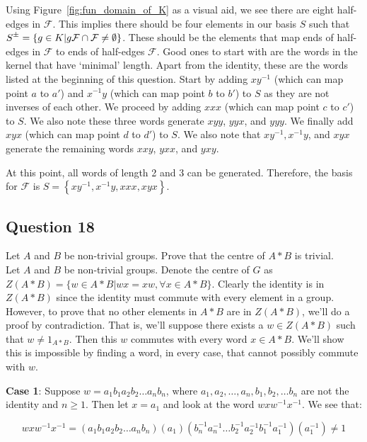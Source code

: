 \documentclass[12pt]{article}%
\newcommand{\rpm}{\raisebox{.2ex}{$\scriptstyle\pm$}}
\begin{document}
Using Figure~\ref{fig:fun_domain_of_K} as a visual aid, we see there are eight half-edges in
$\mathcal{F}$. This implies there should be four elements in our basis $S$ such that $S^{\rpm}=\left\{g\in
K | g\mathcal{F} \cap \mathcal{F} \neq \emptyset \right\}$. These should be the elements that map ends of
half-edges in $\mathcal{F}$ to ends of half-edges $\mathcal{F}$.  Good ones to start with are the words in
the kernel that have `minimal' length. Apart from the identity, these are the words listed at the
beginning of this question. Start by adding $xy^{-1}$ (which can map point $a$ to $a'$) and $x^{-1}y$
(which can map point $b$ to $b'$) to $S$ as they are not inverses of each other. We proceed by adding
$xxx$ (which can map point $c$ to $c'$) to $S$. We also note these three words generate $xyy$, $yyx$,
and $yyy$. We finally add $xyx$ (which can map point $d$ to $d'$) to $S$. We also note that $xy^{-1},
x^{-1}y$, and $xyx$ generate the remaining words $xxy$, $yxx$, and $yxy$. 

At this point, all words of length 2 and 3 can be generated. Therefore, the basis for $\mathcal{F}$ is
$S=\left\{xy^{-1}, x^{-1}y, xxx, xyx\right\}$.

\subsection*{Question 18}

Let $A$ and $B$ be non-trivial groups. Prove that the centre of $A*B$ is trivial. \\

Let $A$ and $B$ be non-trivial groups. Denote the centre of $G$ as
$Z(A*B)=\{ w \in A*B | wx=xw, \forall x \in A*B \}$. Clearly the identity is in $Z(A*B)$ since the
identity must commute with every element in a group. However, to prove that no other elements in $A*B$ are
in $Z(A*B)$, we'll do a proof by contradiction. That is, we'll suppose there exists a $w\in Z(A*B)$ such
that $w \neq 1_{A*B}$. Then this $w$ commutes with every word $x \in A*B$. We'll show this is impossible
by finding a word, in every case, that cannot possibly commute with $w$.

\textbf{Case 1}: Suppose $w=a_{1}b_{1}a_{2}b_{2}\ldots a_{n}b_{n}$, where
$a_1,a_2,\ldots ,a_n, b_1,b_2,\ldots b_n$ are not the identity and $n\geq 1$. Then let $x=a_1$ and look
at the word $wxw^{-1}x^{-1}$. We see that:

\begin{dmath}
wxw^{-1}x^{-1}= (a_{1}b_{1}a_{2}b_{2}\ldots a_{n}b_{n}) (a_{1}) (b_{n}^{-1}a_{n}^{-1}\ldots b_{2}^{-1}a_{2}^{-1}b_{1}^{-1}a_{1}^{-1}) (a_{1}^{-1}) \neq{} 1
\end{dmath}
\end{document}

